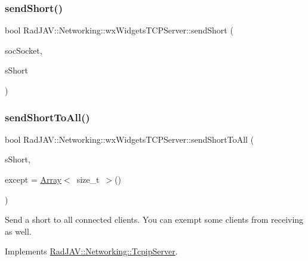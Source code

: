 \subsubsection{\texorpdfstring{send\+Short()}{sendShort()}}
{\footnotesize\ttfamily bool Rad\+J\+A\+V\+::\+Networking\+::wx\+Widgets\+T\+C\+P\+Server\+::send\+Short (\begin{DoxyParamCaption}\item[{wx\+Socket\+Base $\ast$}]{soc\+Socket,  }\item[{short}]{s\+Short }\end{DoxyParamCaption})}

\mbox{\label{class_rad_j_a_v_1_1_networking_1_1wx_widgets_t_c_p_server_a501d55c3cf45c675ddb8b627c5066812}} 
\subsubsection{\texorpdfstring{send\+Short\+To\+All()}{sendShortToAll()}}
{\footnotesize\ttfamily bool Rad\+J\+A\+V\+::\+Networking\+::wx\+Widgets\+T\+C\+P\+Server\+::send\+Short\+To\+All (\begin{DoxyParamCaption}\item[{short}]{s\+Short,  }\item[{\mbox{\hyperlink{class_rad_j_a_v_1_1_array}{Array}}$<$ size\+\_\+t $>$}]{except = {\ttfamily \mbox{\hyperlink{class_rad_j_a_v_1_1_array}{Array}}$<$~size\+\_\+t~$>$()} }\end{DoxyParamCaption})\hspace{0.3cm}{\ttfamily [virtual]}}

Send a short to all connected clients. You can exempt some clients from receiving as well. 

Implements \mbox{\hyperlink{class_rad_j_a_v_1_1_networking_1_1_tcpip_server_a01f6b4d1a26490f540bdf1c070b0e2e0}{Rad\+J\+A\+V\+::\+Networking\+::\+Tcpip\+Server}}.

\mbox{\label{class_rad_j_a_v_1_1_networking_1_1wx_widgets_t_c_p_server_a60916dc2a924530fe488de6d7d38659b}} 
